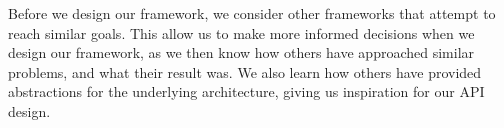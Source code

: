Before we design our framework, we consider other frameworks that attempt to reach similar goals. This allow us to make more informed decisions when we design our framework, as we then know how others have approached similar problems, and what their result was. We also learn how others have provided abstractions for the underlying architecture, giving us inspiration for our API design.

